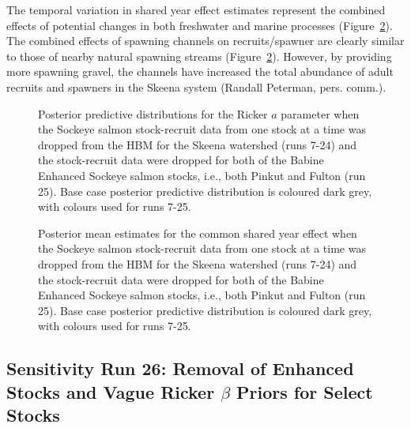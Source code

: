 \documentclass[french,11pt]{book}
\begin{document}
The temporal variation in shared year effect estimates represent the combined effects of potential changes in both freshwater and marine processes (Figure~\ref{fig:jackTE}). The combined effects of spawning channels on recruits/spawner are clearly similar to those of nearby natural spawning streams (Figure~\ref{fig:jackTE}). However, by providing more spawning gravel, the channels have increased the total abundance of adult recruits and spawners in the Skeena system (Randall Peterman, pers. comm.).
\begin{figure}[htb]

{\centering {} 

}

\caption{Posterior predictive distributions for the Ricker $a$ parameter when the Sockeye salmon stock-recruit data from one stock at a time was dropped from the HBM for the Skeena watershed (runs 7-24) and the stock-recruit data were dropped for both of the Babine Enhanced Sockeye salmon stocks, i.e., both Pinkut and Fulton (run 25). Base case posterior predictive distribution is coloured dark grey, with colours used for runs 7-25.}\label{fig:jackProd}
\end{figure}
\begin{figure}[htb]

{\centering {} 

}

\caption{Posterior mean estimates for the common shared year effect when the Sockeye salmon stock-recruit data from one stock at a time was dropped from the HBM for the Skeena watershed (runs 7-24) and the stock-recruit data were dropped for both of the Babine Enhanced Sockeye salmon stocks, i.e., both Pinkut and Fulton (run 25). Base case posterior predictive distribution is coloured dark grey, with colours used for runs 7-25.}\label{fig:jackTE}
\end{figure}
\clearpage

\subsection{\texorpdfstring{Sensitivity Run 26: Removal of Enhanced Stocks and Vague Ricker \(\beta\) Priors for Select Stocks}{Sensitivity Run 26: Removal of Enhanced Stocks and Vague Ricker \textbackslash beta Priors for Select Stocks}}\label{sensitivity-run-26-removal-of-enhanced-stocks-and-vague-ricker-beta-priors-for-select-stocks}
\end{document}
